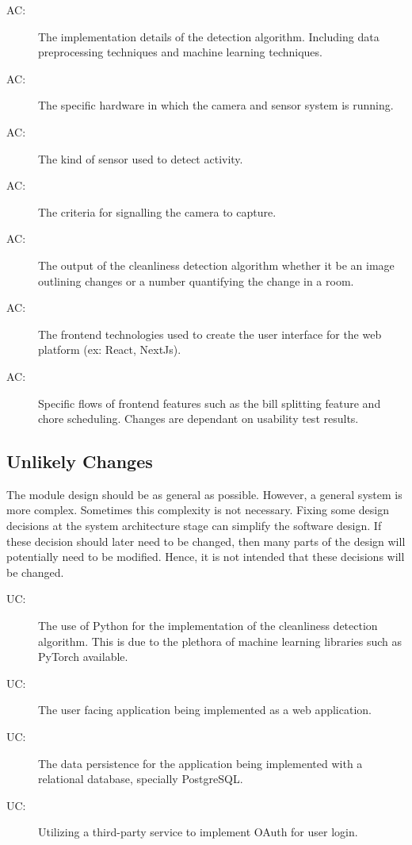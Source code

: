 \documentclass[12pt, titlepage]{article}
\newcounter{acnum}
\newcommand{\actheacnum}{AC\theacnum}
\newcounter{ucnum}
\newcommand{\uctheucnum}{UC\theucnum}
\begin{document}
\begin{description}
\item[ \actheacnum \label{acML}:] The implementation details of the detection algorithm. Including data preprocessing techniques and machine learning techniques.
\item[ \actheacnum \label{acHardware}:] The specific hardware in which the camera and sensor system is running.
\item[ \actheacnum \label{acSensor}:] The kind of sensor used to detect activity.
\item[ \actheacnum \label{acCaptureCriteria}:] The criteria for signalling the camera to capture.
\item[ \actheacnum \label{acAlgoOutput}:] The output of the cleanliness detection algorithm whether it be an image outlining changes or a number quantifying the change in a room.
\item[ \actheacnum \label{acWebFrameworks}:] The frontend technologies used to create the user interface for the web platform (ex: React, NextJs).
\item[ \actheacnum \label{acAppFeatures}:] Specific flows of frontend features such as the bill splitting feature and chore scheduling. Changes are dependant on usability test results.
\end{description}

\subsection{Unlikely Changes} \label{SecUchange}

The module design should be as general as possible. However, a general system is
more complex. Sometimes this complexity is not necessary. Fixing some design
decisions at the system architecture stage can simplify the software design. If
these decision should later need to be changed, then many parts of the design
will potentially need to be modified. Hence, it is not intended that these
decisions will be changed.

\begin{description}
\item[ \uctheucnum \label{ucPython}:] The use of Python for the implementation of the cleanliness detection algorithm. This is due to the plethora of machine learning libraries such as PyTorch available.
\item[ \uctheucnum \label{ucWeb}:] The user facing application being implemented as a web application.
\item[ \uctheucnum \label{ucSql}:] The data persistence for the application being implemented with a relational database, specially PostgreSQL.
\item[ \uctheucnum \label{ucAuth}:]Utilizing a third-party service to implement OAuth for user login.
\end{description}
\end{document}
